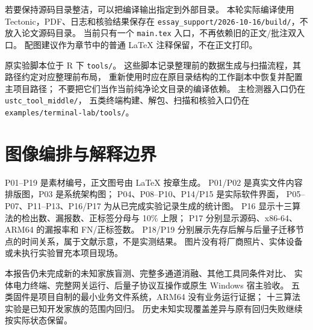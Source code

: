 若要保持源码目录整洁，可以把编译输出指定到外部目录。
本轮实际编译使用 Tectonic，PDF、日志和核验结果保存在
\nolinkurl{essay_support/2026-10-16/build/}，不放入论文源码目录。
当前只有一个 \nolinkurl{main.tex} 入口，不再依赖旧的正文/批注双入口。
配图建议作为章节中的普通 LaTeX 注释保留，不在正文打印。

原实验脚本位于 R 下 \nolinkurl{tools/}。
这些脚本记录整理前的数据生成与扫描流程，其路径约定对应整理前布局，
重新使用时应在原目录结构的工作副本中恢复并配置主项目路径；
不要把它们当作当前纯净论文目录的编译依赖。
主检测器入口仍在 \nolinkurl{ustc_tool_middle/}，
五类终端构建、解包、扫描和核验入口仍在 \nolinkurl{examples/terminal-lab/tools/}。

\section{图像编排与解释边界}
P01--P19 是素材编号，正文图号由 LaTeX 按章生成。
P01/P02 是真实文件内容排版图，P03 是系统架构图；
P04、P08--P10、P14/P15 是实际软件界面，
P05--P07、P11--P13、P16/P17 为从已完成实验记录生成的统计图。
P16 显示十三算法的检出数、漏报数、正标签分母与 10\% 上限；
P17 分别显示源码、x86-64、ARM64 的漏报率和 FN/正标签数。
P18/P19 分别展示先存后解与后量子迁移节点的时间关系，属于文献示意，不是实测结果。
图片没有将厂商照片、实体设备或未执行实验冒充本项目现场。

本报告仍未完成新的未知家族盲测、完整多通道消融、其他工具同条件对比、
实体电力终端、完整网关运行、后量子协议互操作或原生 Windows 宿主验收。
五类固件是项目自制的最小业务文件系统，ARM64 没有业务运行证据；
十三算法实验是已知开发家族的范围内回归。
历史未知实现覆盖差异与原有回归失败继续按实际状态保留。
